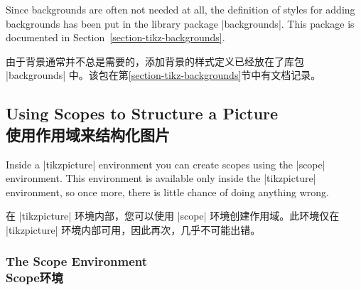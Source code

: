 Since backgrounds are often not needed at all, the definition of styles for
adding backgrounds has been put in the library package |backgrounds|. This
package is documented in Section~\ref{section-tikz-backgrounds}.

由于背景通常并不总是需要的，添加背景的样式定义已经放在了库包 |backgrounds| 中。该包在第\ref{section-tikz-backgrounds}节中有文档记录。


\subsection{Using Scopes to Structure a Picture\\使用作用域来结构化图片}

Inside a |{tikzpicture}| environment you can create scopes using the |{scope}|
environment. This environment is available only inside the |{tikzpicture}|
environment, so once more, there is little chance of doing anything wrong.

在 |{tikzpicture}| 环境内部，您可以使用 |{scope}| 环境创建作用域。此环境仅在 |{tikzpicture}| 环境内部可用，因此再次，几乎不可能出错。


\subsubsection{The Scope Environment\\Scope环境}

